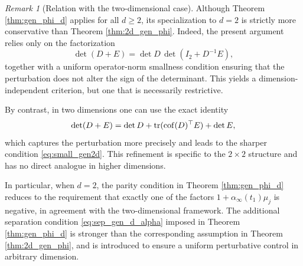\documentclass[11pt]{amsart}
\numberwithin{equation}{section}
\theoremstyle{definition}
\theoremstyle{remark}
\newtheorem{remark}[theorem]{Remark}
\numberwithin{equation}{section}
\newtheorem{remark}[theorem]{Remark}
\newcommand{\tr}{{\rm tr}}
\newcommand{\cof}{{\rm cof}}
\renewcommand{\ge}{\geqslant}
\begin{document}
\begin{remark}[Relation with the two-dimensional case]
Although Theorem \ref{thm:gen_phi_d} applies for all $d\ge2$, its specialization to $d=2$ is strictly more conservative than Theorem \ref{thm:2d_gen_phi}. Indeed, the present argument relies only on the factorization
\[
\det(D+E)=\det D\,\det(I_2+D^{-1}E),
\]
together with a uniform operator-norm smallness condition ensuring that the perturbation does not alter the sign of the determinant. This yields a dimension-independent criterion, but one that is necessarily restrictive.

By contrast, in two dimensions one can use the exact identity
\[
\det(D+E)=\det D+\tr(\cof(D)^\top E)+\det E,
\]
which captures the perturbation more precisely and leads to the sharper condition \eqref{eq:small_gen2d}. This refinement is specific to the $2\times2$ structure and has no direct analogue in higher dimensions.

In particular, when $d=2$, the parity condition in Theorem \ref{thm:gen_phi_d} reduces to the requirement that exactly one of the factors $1+\alpha_\infty(t_1)\mu_j$ is negative, in agreement with the two-dimensional framework. The additional separation condition \eqref{eq:sep_gen_d_alpha} imposed in Theorem \ref{thm:gen_phi_d} is stronger than the corresponding assumption in Theorem \ref{thm:2d_gen_phi}, and is introduced to ensure a uniform perturbative control in arbitrary dimension.
\end{remark}
 
\end{document}
